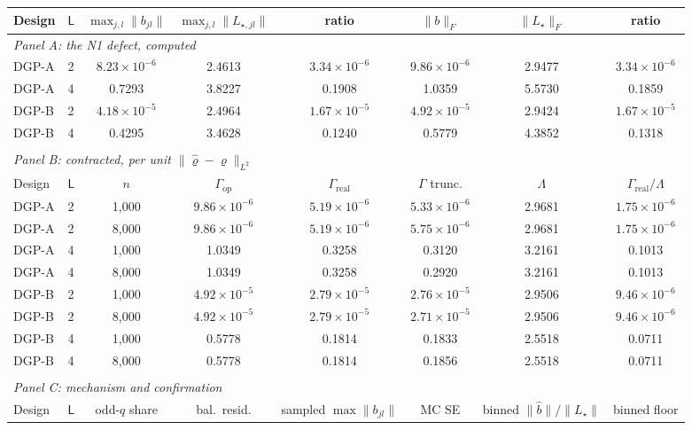 \begin{tabular}{llcccccc}
\toprule
Design & $\mathsf L$ & $\max_{j,l}\|b_{jl}\|$ & $\max_{j,l}\|L_{\star,jl}\|$ & ratio & $\|b\|_F$ & $\|L_\star\|_F$ & ratio \\
\midrule
\multicolumn{8}{l}{\textit{Panel A: the N1 defect, computed}} \\
\midrule
DGP-A & 2 & $8.23\times10^{-6}$ & 2.4613 & $3.34\times10^{-6}$ & $9.86\times10^{-6}$ & 2.9477 & $3.34\times10^{-6}$ \\
DGP-A & 4 & 0.7293 & 3.8227 & 0.1908 & 1.0359 & 5.5730 & 0.1859 \\
DGP-B & 2 & $4.18\times10^{-5}$ & 2.4964 & $1.67\times10^{-5}$ & $4.92\times10^{-5}$ & 2.9424 & $1.67\times10^{-5}$ \\
DGP-B & 4 & 0.4295 & 3.4628 & 0.1240 & 0.5779 & 4.3852 & 0.1318 \\
\\[0.5em]
\multicolumn{8}{l}{\textit{Panel B: contracted, per unit $\|\hat\varrho-\varrho\|_{L^2}$}} \\
\midrule
Design & $\mathsf L$ & $n$ & $\Gamma_{\mathrm{op}}$ & $\Gamma_{\mathrm{real}}$ & $\Gamma$ trunc. & $\Lambda$ & $\Gamma_{\mathrm{real}}/\Lambda$ \\
\midrule
DGP-A & 2 & 1,000 & $9.86\times10^{-6}$ & $5.19\times10^{-6}$ & $5.33\times10^{-6}$ & 2.9681 & $1.75\times10^{-6}$ \\
DGP-A & 2 & 8,000 & $9.86\times10^{-6}$ & $5.19\times10^{-6}$ & $5.75\times10^{-6}$ & 2.9681 & $1.75\times10^{-6}$ \\
DGP-A & 4 & 1,000 & 1.0349 & 0.3258 & 0.3120 & 3.2161 & 0.1013 \\
DGP-A & 4 & 8,000 & 1.0349 & 0.3258 & 0.2920 & 3.2161 & 0.1013 \\
DGP-B & 2 & 1,000 & $4.92\times10^{-5}$ & $2.79\times10^{-5}$ & $2.76\times10^{-5}$ & 2.9506 & $9.46\times10^{-6}$ \\
DGP-B & 2 & 8,000 & $4.92\times10^{-5}$ & $2.79\times10^{-5}$ & $2.71\times10^{-5}$ & 2.9506 & $9.46\times10^{-6}$ \\
DGP-B & 4 & 1,000 & 0.5778 & 0.1814 & 0.1833 & 2.5518 & 0.0711 \\
DGP-B & 4 & 8,000 & 0.5778 & 0.1814 & 0.1856 & 2.5518 & 0.0711 \\
\\[0.5em]
\multicolumn{8}{l}{\textit{Panel C: mechanism and confirmation}} \\
\midrule
Design & $\mathsf L$ & odd-$q$ share & bal.\ resid. & sampled $\max\|b_{jl}\|$ & MC SE & binned $\|\hat b\|/\|L_\star\|$ & binned floor \\

\end{tabular}
